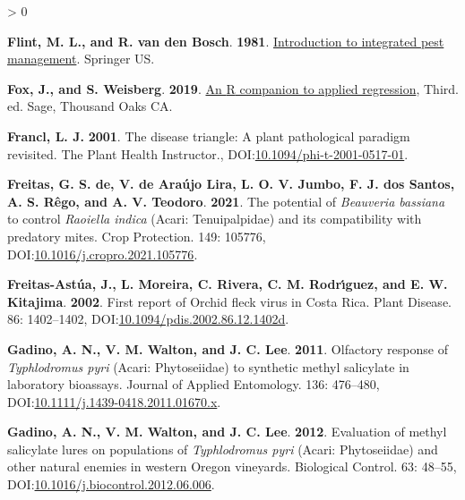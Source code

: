 \documentclass{ufdissertation}[overrideChapters] %
\newlength{\cslhangindent}
\newenvironment{CSLReferences}[2] %
 {%
  \setlength{\parindent}{0pt}
  \ifodd #1 \everypar{\setlength{\hangindent}{\cslhangindent}}\ignorespaces\fi
  \ifnum #2 > 0
  \setlength{\parskip}{#2\baselineskip}
  \fi
 }%
 {}
\begin{document}
{\begin{CSLReferences}{1}{1}
\leavevmode{}%
\textbf{Flint, M. L., and R. van den Bosch}. \textbf{1981}. \href{https://doi.org/10.1007/978-1-4615-9212-9}{Introduction to integrated pest management}. Springer {US}.

\leavevmode{}%
\textbf{Fox, J., and S. Weisberg}. \textbf{2019}. \href{https://socialsciences.mcmaster.ca/jfox/Books/Companion/}{An {R} companion to applied regression}, Third. ed. Sage, Thousand Oaks {CA}.

\leavevmode{}%
\textbf{Francl, L. J.} \textbf{2001}. The disease triangle: A plant pathological paradigm revisited. The Plant Health Instructor., DOI:\href{https://doi.org/10.1094/phi-t-2001-0517-01}{10.1094/phi-t-2001-0517-01}.

\leavevmode{}%
\textbf{Freitas, G. S. de, V. de Araújo Lira, L. O. V. Jumbo, F. J. dos Santos, A. S. Rêgo, and A. V. Teodoro}. \textbf{2021}. The potential of {\emph{Beauveria bassiana}} to control {\emph{Raoiella indica}} ({Acari}: {Tenuipalpidae}) and its compatibility with predatory mites. Crop Protection. 149: 105776, DOI:\href{https://doi.org/10.1016/j.cropro.2021.105776}{10.1016/j.cropro.2021.105776}.

\leavevmode{}%
\textbf{Freitas-Astúa, J., L. Moreira, C. Rivera, C. M. Rodrı́guez, and E. W. Kitajima}. \textbf{2002}. First report of {Orchid fleck virus} in {Costa Rica}. Plant Disease. 86: 1402--1402, DOI:\href{https://doi.org/10.1094/pdis.2002.86.12.1402d}{10.1094/pdis.2002.86.12.1402d}.

\leavevmode{}%
\textbf{Gadino, A. N., V. M. Walton, and J. C. Lee}. \textbf{2011}. Olfactory response of {\emph{Typhlodromus pyri}} {({Acari}: {Phytoseiidae})} to synthetic methyl salicylate in laboratory bioassays. Journal of Applied Entomology. 136: 476--480, DOI:\href{https://doi.org/10.1111/j.1439-0418.2011.01670.x}{10.1111/j.1439-0418.2011.01670.x}.

\leavevmode{}%
\textbf{Gadino, A. N., V. M. Walton, and J. C. Lee}. \textbf{2012}. Evaluation of methyl salicylate lures on populations of {\emph{Typhlodromus pyri}} {({Acari}: {Phytoseiidae})} and other natural enemies in western {Oregon} vineyards. Biological Control. 63: 48--55, DOI:\href{https://doi.org/10.1016/j.biocontrol.2012.06.006}{10.1016/j.biocontrol.2012.06.006}.


\end{CSLReferences}}
\end{document}
